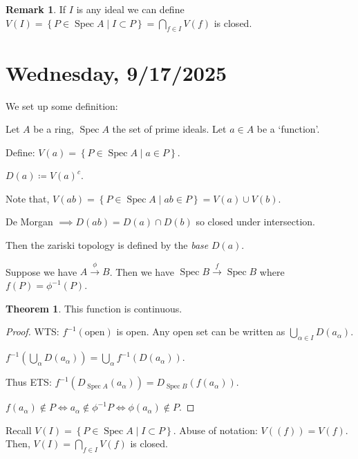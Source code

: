 \documentclass{article}
\theoremstyle{definition}
\newtheorem{theorem}{Theorem}
\newtheorem*{remark}{Remark}
\begin{document}
    \begin{remark}
        If \(I\) is any ideal we can define \(V(I) = \left\{ P \in \operatorname{Spec} A \mid I \subset P \right\} = \bigcap_{f\in I} V(f)\) is closed.
    \end{remark}

    \section*{Wednesday, 9/17/2025}
    
    We set up some definition:

    Let \(A\) be a ring, \(\operatorname{Spec} A\) the set of prime ideals. Let \(a\in A\) be a `function'.

    Define: \(V(a) = \left\{ P \in \operatorname{Spec} A \mid a\in P \right\}\).

    \(D(a) \coloneqq V(a) ^{c}\).

    Note that, \(V(ab) = \left\{ P \in \operatorname{Spec} A \mid ab\in P \right\} = V(a) \cup V(b)\).

    De Morgan \(\implies D(ab) = D(a) \cap D(b)\) so closed under intersection.

    Then the zariski topology is defined by the \textit{base} \(D(a)\).

    Suppose we have \(A \xrightarrow{\phi} B\). Then we have \(\operatorname{Spec} B \xrightarrow{f} \operatorname{Spec} B\) where \(f(P) = \phi ^{-1} (P)\).
    
    \begin{theorem}
        This function is continuous.
    \end{theorem}

    \begin{proof}
        WTS: \(f ^{-1} (\text{open})\) is open. Any open set can be written as \(\bigcup_{\alpha \in I} D(a_\alpha)\).

        \(f ^{-1} \left( \bigcup_\alpha D(a_\alpha) \right) = \bigcup_\alpha f ^{-1} (D(a_\alpha))\).

        Thus ETS: \(f ^{-1} (D_{\operatorname{Spec} A}(a_\alpha)) = D_{\operatorname{Spec} B}(f(a_\alpha))\).
        
        \(f(a_\alpha) \notin P \iff a_\alpha \notin \phi ^{-1} P \iff \phi(a_\alpha) \notin P\).
    \end{proof}

    Recall \(V(I) = \left\{ P\in \operatorname{Spec} A \mid I \subset P \right\}\). Abuse of notation: \(V((f)) = V(f)\). Then, \(V(I) = \bigcap_{f\in I} V(f)\) is closed. 
\end{document}
